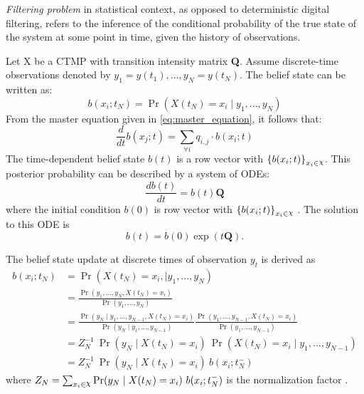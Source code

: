 \textit{Filtering problem} in statistical context, as opposed to deterministic digital filtering, refers to the inference of the conditional probability of the true state of the system at some point in time, given the history of observations. \cite{Godsill2019}

Let X be a CTMP with transition intensity matrix \textbf{Q}. Assume discrete-time observations denoted by $ y_{1}=y(t_{1}), ..., y_{N}=y(t_{N}) $. The belief state can be written as:
\begin{equation}
	b(x_{i};t_{N}) = \operatorname{Pr}(X(t_{N}) = x_{i} \mid y_{1}, ..., y_{N})
\end{equation}
From the master equation given in \autoref{eq:master_equation}, it follows that:
\begin{equation}
 \frac{d}{dt} b(x_{j};t)  = \sum_{\forall i} q_{i,j} \cdot b(x_{i};t)
\end{equation}
The time-dependent belief state $ b(t) $ is a row vector with $ \left\lbrace b(x_{i};t)\right\rbrace_{x_{i} \in \rchi}  $.
This posterior probability can be described by a system of ODEs:
\begin{equation}
\frac{db(t)}{dt} = b(t)\textbf{Q}
\end{equation}
where the initial condition $ b(0) $ is row vector with $ \left\lbrace b(x_{i};t)\right\rbrace_{x_{i} \in \rchi} $ \cite{article}. The solution to this ODE is
\begin{equation}
b(t) = b(0) \exp(t\textbf{Q}).
\label{eq:b_cont}
\end{equation}

The belief state update at discrete times of observation $ y_{t} $ is derived as 
\begin{align}
b(x_{i}; t_{N}) & = \operatorname{Pr}( X(t_{N}) = x_{i},\mid y_{1}, ..., y_{N}) \nonumber\\ & = \frac{\operatorname{Pr}(y_{1}, ..., y_{N}, X(t_{N}) = x_{i})}{\operatorname{Pr}(y_{1}, ..., y_{N})}  \nonumber\\ & = \frac{\operatorname{Pr}(y_{N} \mid y_{1}, ..., y_{N-1}, X(t_{N}) = x_{i})}{\operatorname{Pr}(y_{N} \mid y_{1}, ..., y_{N-1})} \frac{\operatorname{Pr}(y_{1}, ..., y_{N-1}, X(t_{N}) = x_{i})}{\operatorname{Pr}(y_{1}, ..., y_{N-1})}  \nonumber\\ & = Z_{N}^{-1} \ \operatorname{Pr}(y_{N} \mid X(t_{N})=x_{i})\ \operatorname{Pr}( X(t_{N}) = x_{i}\mid y_{1}, ..., y_{N-1})  \nonumber\\ & = Z_{N}^{-1}\ {\operatorname{Pr}(y_{N} \mid X(t_{N})=x_{i})}\ {b(x_{i}; t_{N}^{-})}
\label{eq:b_jump}
\end{align}
where $ Z_{N} = \sum_{x_{i}\in \rchi} \operatorname{Pr}(y_{N} \mid X(t_{N})=x_{i})\ b(x_{i}; t_{N}^{-}) $ is the normalization factor \cite{article}.

